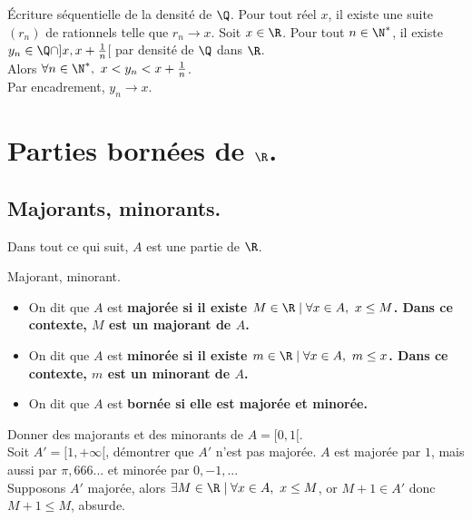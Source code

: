 \documentclass[11pt]{article}
\begin{document}
\begin{corr}{Écriture séquentielle de la densité de $\Q$.}{}
    Pour tout réel $x$, il existe une suite $(r_n)$ de rationnels telle que $r_n\to x$.
    \tcblower
    Soit $x\in\R$. Pour tout $n\in\N^*$, il existe $y_n\in\Q\cap]x,x+\frac{1}{n}$[ par densité de $\Q$ dans $\R$.\\
    Alors $\forall n\in\N^*, ~ x<y_n<x+\frac{1}{n}$.\\
    Par encadrement, $y_n\to x$. 
\end{corr}

\section{Parties bornées de \texorpdfstring{$\R$}{Lg}.}

\subsection{Majorants, minorants.}

Dans tout ce qui suit, $A$ est une partie de $\R$.

\begin{defi}{Majorant, minorant.}{}
    \begin{itemize}
        \item On dit que $A$ est \bf{majorée} si il existe $M\in\R\mid\forall x\in A,~ x\leq M$.
        Dans ce contexte, $M$ est un \bf{majorant} de $A$.
        \item On dit que $A$ est \bf{minorée} si il existe $m\in\R\mid\forall x\in A,~ m\leq x$.
        Dans ce contexte, $m$ est un \bf{minorant} de $A$.
        \item On dit que $A$ est \bf{bornée} si elle est majorée et minorée.
    \end{itemize}
\end{defi}

\begin{ex}{}{}
    Donner des majorants et des minorants de $A=[0,1[$.\\
    Soit $A'=[1,+\infty[$, démontrer que $A'$ n'est pas majorée.
    \tcblower
    $A$ est majorée par $1$, mais aussi par $\pi,666$... et minorée par $0, -1,...$\\
    Supposons $A'$ majorée, alors $\exists M\in\R\mid\forall x\in A,~x\leq M$, or $M+1\in A'$ donc $M+1\leq M$, absurde.
\end{ex}
\end{document}
